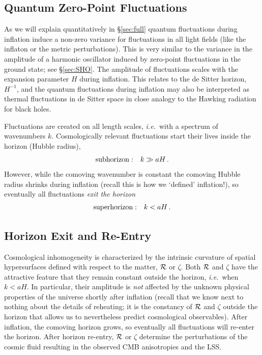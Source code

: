 \documentclass[12pt,letterpaper,rotate]{article}
\def\beq{\begin{equation}}
\def\eeq{\end{equation}}
\def\R{{\cal R}}
\begin{document}
{\subsection{Quantum Zero-Point Fluctuations}

As we will explain quantitatively in \S\ref{sec:full} quantum fluctuations during inflation induce a non-zero variance for fluctuations in all light fields (like the inflaton or the metric perturbations).
This is very similar to the variance in the amplitude of a harmonic oscillator induced by zero-point fluctuations in the ground state; see \S\ref{sec:SHO}.
The amplitude of fluctuations scales with the expansion parameter $H$ during inflation.
This relates to the de Sitter horizon, $H^{-1}$, and the quantum fluctuations during inflation may also be interpreted as thermal fluctuations in de Sitter space in close analogy to the Hawking radiation for black holes.

Fluctuations are created on all length scales, {\it i.e.}~with a spectrum of wavenumbers $k$.
Cosmologically relevant fluctuations start their lives inside the horizon (Hubble radius), 
\beq {\rm subhorizon:} \quad
k \gg aH\, .
\eeq
However, while the comoving wavenumber is constant the comoving Hubble radius shrinks during inflation (recall this is how we `defined' inflation!), so eventually all fluctuations {\it exit the horizon}
\beq {\rm superhorizon:} \quad
k < aH\, .
\eeq

\subsection{Horizon Exit and Re-Entry}

Cosmological inhomogeneity is characterized by the intrinsic curvature of spatial hypersurfaces defined with respect to the matter, $\R$ or $\zeta$.
Both ${\cal R}$ and $\zeta$ have the attractive feature that they remain constant outside the horizon, {\it i.e.}~when $k < aH$.
In particular, their amplitude is {\it not} affected by the unknown physical properties of the universe shortly after inflation (recall that we know next to nothing about the details of reheating; it is the constancy of $\R$ and $\zeta$ outside the horizon that allows us to nevertheless predict cosmological observables).
After inflation, the comoving horizon grows, so eventually all fluctuations will re-enter the horizon.
After horizon re-entry, $\R$ or $\zeta$ determine the perturbations of the cosmic fluid resulting in the observed CMB anisotropies and the LSS.\\ %


}
\end{document}
